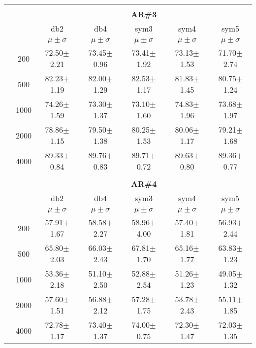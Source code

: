 \begin{table}[H]
\begin{tabular}{|c|c|c c c c c|}
\\ \midrule
\multicolumn{7}{c}{}\\ 



\cline{3-7}
\multicolumn{2}{c|}{\multirow{3}{*}{}} & \multicolumn{5}{c|}{\textbf{AR\#3}}   \\\cline{3-7} 

\multicolumn{2}{c|}{}  & db2 & db4 & sym3 & sym4 & sym5 \\\cline{3-7}
\multicolumn{2}{c|}{}& $\mu \pm \sigma$ & $\mu \pm \sigma$ & $\mu \pm \sigma$ & $\mu \pm \sigma$ & $\mu \pm \sigma$ \\\hline

\multicolumn{1}{|c|}{ \multirow{5}{*}{\rotatebox[origin=c]{90}{\textbf{Neurônios}}} }
&200	&72.50$\pm$2.21	&73.45$\pm$0.96	&73.41$\pm$1.92	&73.13$\pm$1.53	&71.70$\pm$2.74\\\cline{2-7}
&500	&82.23$\pm$1.19	&82.00$\pm$1.29	&82.53$\pm$1.17	&81.83$\pm$1.45	&80.75$\pm$1.24\\\cline{2-7}
&1000	&74.26$\pm$1.59	&73.30$\pm$1.37	&73.10$\pm$1.60	&74.83$\pm$1.96	&73.68$\pm$1.97\\\cline{2-7}
&2000	&78.86$\pm$1.15	&79.50$\pm$1.38	&80.25$\pm$1.53	&80.06$\pm$1.17	&79.21$\pm$1.68\\\cline{2-7}
&4000	&89.33$\pm$0.84	&89.76$\pm$0.83	&89.71$\pm$0.72	&89.63$\pm$0.80	&89.36$\pm$0.77


\\\midrule 
\multicolumn{7}{c}{}\\ 



\cline{3-7}
\multicolumn{2}{c|}{\multirow{3}{*}{}} & \multicolumn{5}{c|}{\textbf{AR\#4}}   \\\cline{3-7} 

\multicolumn{2}{c|}{}  & db2 & db4 & sym3 & sym4 & sym5 \\\cline{3-7}
\multicolumn{2}{c|}{}& $\mu \pm \sigma$ & $\mu \pm \sigma$ & $\mu \pm \sigma$ & $\mu \pm \sigma$ & $\mu \pm \sigma$ \\\hline

\multicolumn{1}{|c|}{ \multirow{5}{*}{\rotatebox[origin=c]{90}{\textbf{Neurônios}}} }
&200	&57.91$\pm$1.67	&58.58$\pm$2.27	&58.96$\pm$4.00	&57.40$\pm$1.81	&56.93$\pm$2.44\\\cline{2-7}
&500	&65.80$\pm$2.03	&66.03$\pm$2.43	&67.81$\pm$1.70	&65.16$\pm$1.77	&63.83$\pm$1.23\\\cline{2-7}
&1000	&53.36$\pm$2.18	&51.10$\pm$2.50	&52.88$\pm$2.54	&51.26$\pm$1.23	&49.05$\pm$1.32\\\cline{2-7}
&2000	&57.60$\pm$1.51	&56.88$\pm$2.12	&57.28$\pm$1.75	&53.78$\pm$2.43	&55.11$\pm$1.85\\\cline{2-7}
&4000	&72.78$\pm$1.17	&73.40$\pm$1.37	&74.00$\pm$0.75	&72.30$\pm$1.47	&72.03$\pm$1.35\\\midrule
	\end{tabular}

\end{table} %

